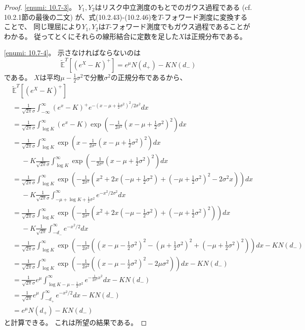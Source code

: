 \documentclass[uplatex]{jsarticle}
\theoremstyle{definition}
\def\E{\mathbb{E}}
\begin{document}
\begin{proof}
  \ref{enumi: 10.7-3}。
  \(Y_1,Y_2\)はリスク中立測度のもとでのガウス過程である
  (cf. 10.2.1節の最後の二文)
  が、式(10.2.43)-(10.2.46)を\(T\)-フォワード測度に変換することで、
  同じ理屈により\(Y_1,Y_2\)は\(T\)-フォワード測度でもガウス過程であることがわかる。
  従ってとくにそれらの線形結合に定数を足した\(X\)は正規分布である。

  \ref{enumi: 10.7-4}。
  示さなければならないのは
  \[\tilde{\E}^T\left[(e^X-K)^+\right] = e^{\mu}N(d_+)-KN(d_-)\]
  である。
  \(X\)は平均\(\mu-\frac{1}{2}\sigma^2\)で分散\(\sigma^2\)の正規分布であるから、
  \begin{align*}
    &\tilde{\E}^T\left[(e^X-K)^+\right] \\
    &= \frac{1}{\sqrt{2\pi}\sigma}\int_{-\infty}^{\infty}
    \left(e^x-K\right)^+e^{-(x-\mu+\frac{1}{2}\sigma^2)^2/2\sigma^2} dx \\
    &= \frac{1}{\sqrt{2\pi}\sigma}\int_{\log K}^{\infty}(e^x-K)\exp\left(
    -\frac{1}{2\sigma^2}\left(x-\mu+\frac{1}{2}\sigma^2\right)^2\right) dx \\
    &= \frac{1}{\sqrt{2\pi}\sigma}\int_{\log K}^{\infty}\exp\left(
    x-\frac{1}{2\sigma^2}\left(x-\mu+\frac{1}{2}\sigma^2\right)^2\right) dx \\
    &\ \ \ \ \ \
    - K\frac{1}{\sqrt{2\pi}\sigma}\int_{\log K}^{\infty}\exp\left(
    -\frac{1}{2\sigma^2}\left(x-\mu+\frac{1}{2}\sigma^2\right)^2\right) dx \\
    &= \frac{1}{\sqrt{2\pi}\sigma}\int_{\log K}^{\infty}\exp\left(
    -\frac{1}{2\sigma^2}\left(
    x^2 + 2x\left(-\mu+\frac{1}{2}\sigma^2\right)
    + \left(-\mu+\frac{1}{2}\sigma^2\right)^2
    - 2\sigma^2x \right) \right) dx \\
    &\ \ \ \ \ \
    - K\frac{1}{\sqrt{2\pi}\sigma}\int_{-\mu+\log K+\frac{1}{2}\sigma^2}^{\infty}
    e^{-x^2/2\sigma^2} dx \\
    &= \frac{1}{\sqrt{2\pi}\sigma}\int_{\log K}^{\infty}\exp\left(
    -\frac{1}{2\sigma^2}\left(
    x^2 + 2x\left(-\mu-\frac{1}{2}\sigma^2\right)
    + \left(-\mu+\frac{1}{2}\sigma^2\right)^2 \right)\right) dx \\
    &\ \ \ \ \ \
    - K\frac{1}{\sqrt{2\pi}}\int_{-d_-}^{\infty}e^{-x^2/2} dx \\
    &= \frac{1}{\sqrt{2\pi}\sigma}\int_{\log K}^{\infty}\exp\left(
    -\frac{1}{2\sigma^2}\left(
    \left(x -\mu-\frac{1}{2}\sigma^2\right)^2
    - \left( \mu+\frac{1}{2}\sigma^2\right)^2
    + \left(-\mu+\frac{1}{2}\sigma^2\right)^2
    \right)\right) dx - KN(d_-) \\
    &= \frac{1}{\sqrt{2\pi}\sigma}\int_{\log K}^{\infty}\exp\left(
    -\frac{1}{2\sigma^2}\left(
    \left(x -\mu-\frac{1}{2}\sigma^2\right)^2
    - 2\mu\sigma^2 \right)\right) dx - KN(d_-) \\
    &= \frac{1}{\sqrt{2\pi}\sigma}e^{\mu}
    \int_{\log K-\mu-\frac{1}{2}\sigma^2}^{\infty}
    e^{-\frac{1}{2\sigma^2}x^2} dx - KN(d_-) \\
    &= \frac{1}{\sqrt{2\pi}}e^{\mu}\int_{-d_+}^{\infty}
    e^{-x^2/2} dx - KN(d_-) \\
    &= e^{\mu}N(d_+) - KN(d_-)
  \end{align*}
  と計算できる。
  これは所望の結果である。
\end{proof}
\end{document}
